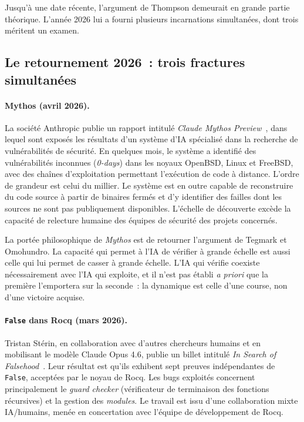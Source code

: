 \documentclass[11pt,a4paper]{article}
\begin{document}
Jusqu'à une date récente, l'argument de Thompson demeurait en grande partie théorique. L'année 2026 lui a fourni plusieurs incarnations simultanées, dont trois méritent un examen.

\subsection{Le retournement 2026~: trois fractures simultanées}

\paragraph{Mythos (avril 2026).} La société Anthropic publie un rapport intitulé \emph{Claude Mythos Preview}~\parencite{anthropic2026mythos}, dans lequel sont exposés les résultats d'un système d'IA spécialisé dans la recherche de vulnérabilités de sécurité. En quelques mois, le système a identifié des vulnérabilités inconnues (\emph{0-days}) dans les noyaux OpenBSD, Linux et FreeBSD, avec des chaînes d'exploitation permettant l'exécution de code à distance. L'ordre de grandeur est celui du millier. Le système est en outre capable de reconstruire du code source à partir de binaires fermés et d'y identifier des failles dont les sources ne sont pas publiquement disponibles. L'échelle de découverte excède la capacité de relecture humaine des équipes de sécurité des projets concernés.

La portée philosophique de \emph{Mythos} est de retourner l'argument de Tegmark et Omohundro. La capacité qui permet à l'IA de vérifier à grande échelle est aussi celle qui lui permet de casser à grande échelle. L'IA qui vérifie coexiste nécessairement avec l'IA qui exploite, et il n'est pas établi \emph{a priori} que la première l'emportera sur la seconde~: la dynamique est celle d'une course, non d'une victoire acquise.

\paragraph{\texttt{False} dans Rocq (mars 2026).} Tristan Stérin, en collaboration avec d'autres chercheurs humains et en mobilisant le modèle Claude Opus 4.6, publie un billet intitulé \emph{In Search of Falsehood}~\parencite{sterin2026falsehood,rocqfalse2026}. Leur résultat est qu'ils exhibent sept preuves indépendantes de \texttt{False}, acceptées par le noyau de Rocq. Les bugs exploités concernent principalement le \emph{guard checker} (vérificateur de terminaison des fonctions récursives) et la gestion des \emph{modules}. Le travail est issu d'une collaboration mixte IA/humains, menée en concertation avec l'équipe de développement de Rocq.
\end{document}

